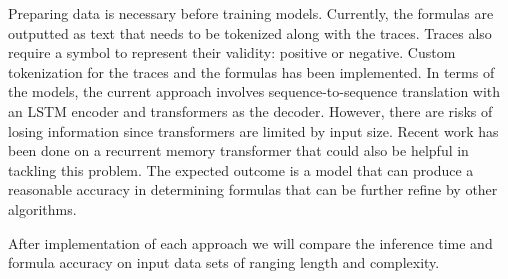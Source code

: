 \documentclass[12pt]{article}
\begin{document}
\begin{itemize}
Preparing data is necessary before training models. Currently, the formulas are outputted as text that needs to be tokenized along with the traces. Traces also require a symbol to represent their validity: positive or negative. Custom tokenization for the traces and the formulas has been implemented. In terms of the models, the current approach involves sequence-to-sequence translation with an LSTM encoder and transformers as the decoder. However, there are risks of losing information since transformers are limited by input size. Recent work has been done on a recurrent memory transformer that could also be helpful in tackling this problem. The expected outcome is a model that can produce a reasonable accuracy in determining formulas that can be further refine by other algorithms.
\end{itemize} 


After implementation of each approach we will compare the inference time and formula accuracy on input data sets of ranging length and complexity.
\end{document}
